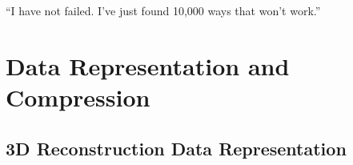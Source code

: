 \begin{savequote}[8cm]
  ``I have not failed. I've just found 10,000 ways that won't work.''
\end{savequote}
\makeatletter
\chapter{Data Representation and Compression}

\section{3D Reconstruction Data Representation}
\label{sec:3DDataRepresentations}

